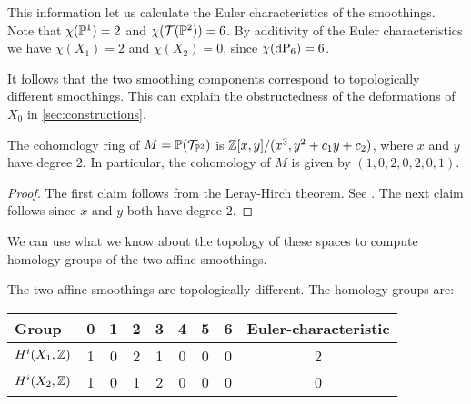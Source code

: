 This information let us calculate the Euler characteristics of the smoothings. Note that $\chi(\P^1)=2$ and $\chi(\mathcal T(\P^2))=6$. By additivity of the Euler characteristics we have $\chi(X_1)=2$ and $\chi(X_2)=0$, since $\chi(\dP6)=6$.

It follows that the two smoothing components correspond to topologically different smoothings. This can explain the obstructedness of the deformations of $X_0$ in \cref{sec:constructions}.


\begin{lemma}
The cohomology ring of $M=\P(\mathcal T_{\P^2})$ is $\Z[x,y]/(x^3,y^2+c_1y+c_2)$, where $x$ and $y$ have degree $2$. In particular, the cohomology of $M$ is given by $(1,0,2,0,2,0,1)$.
\end{lemma}
\begin{proof}
The first claim follows from the Leray-Hirch theorem. See \cite[page 270]{bott_tu}. The next claim follows since $x$ and $y$ both have degree $2$.
\end{proof}

We can use what we know about the topology of these spaces to compute homology groups of the two affine smoothings.

\begin{theorem}
The two affine smoothings are topologically different. The homology groups are:
\begin{center}
\begin{tabular}{ l || c | c | c | c | c | c | c || c }
 Group & 0 & 1 & 2 & 3 & 4 & 5 & 6 & Euler-characteristic \\
\hline
$H^i(X_1,\Z)$ & 1 & 0 & 2 & 1 & 0 & 0 & 0 & 2 \\
$H^i(X_2,\Z)$ & 1 & 0 & 1 & 2 & 0 & 0 & 0  & 0
\end{tabular}
\end{center}
\end{theorem}

